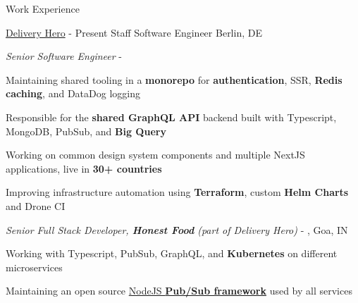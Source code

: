 \documentclass[../resume.tex]{subfiles}
\begin{document}
\begin{rSection}{Work Experience}

\begin{rSubsection}
    {\href{https://go.rohit.page/dh}{Delivery Hero}}
    {  - Present}
    {Staff Software Engineer}
    {Berlin, DE}
    \begin{rSubsectionHeading}
        {\normalfont \em Senior Software Engineer}
        {  - }
        {}{}
    \end{rSubsectionHeading}

    \item Maintaining shared tooling in a \textbf{monorepo} for \textbf{authentication}, SSR, \textbf{Redis caching}, and DataDog logging
    \item Responsible for the \textbf{shared GraphQL API} backend built with Typescript, MongoDB, PubSub, and \textbf{Big Query}
    \item Working on common design system components and multiple NextJS applications, live in \textbf{30+ countries}
    \item Improving infrastructure automation using \textbf{Terraform}, custom \textbf{Helm Charts} and Drone CI

    \begin{rSubsectionHeading}
        {\normalfont \em Senior Full Stack Developer, \textbf{Honest Food} (part of Delivery Hero)}
        {  - , Goa, IN}
        {}{}
    \end{rSubsectionHeading}

    \item Working with Typescript, PubSub, GraphQL, and \textbf{Kubernetes} on different microservices
    \item Maintaining an open source \href{https://go.rohit.page/hfc-pubsub}{NodeJS \textbf{Pub/Sub framework}} used by all services

\end{rSubsection}


\end{rSection}
\end{document}
